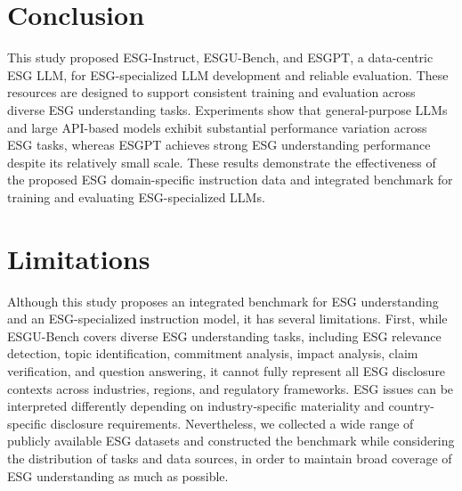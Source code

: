 \documentclass[11pt]{article}
\begin{document}
\section{Conclusion}
\label{sec:conclusion}
This study proposed \textsf{ESG-Instruct}, \textsf{ESGU-Bench}, and \textsf{ESGPT}, a data-centric ESG LLM, for ESG-specialized LLM development and reliable evaluation. These resources are designed to support consistent training and evaluation across diverse ESG understanding tasks. Experiments show that general-purpose LLMs and large API-based models exhibit substantial performance variation across ESG tasks, whereas \textsf{ESGPT} achieves strong ESG understanding performance despite its relatively small scale. These results demonstrate the effectiveness of the proposed ESG domain-specific instruction data and integrated benchmark for training and evaluating ESG-specialized LLMs.

\section*{Limitations}
Although this study proposes an integrated benchmark for ESG understanding and an ESG-specialized instruction model, it has several limitations. 
First, while \textsf{ESGU-Bench} covers diverse ESG understanding tasks, including ESG relevance detection, topic identification, commitment analysis, impact analysis, claim verification, and question answering, it cannot fully represent all ESG disclosure contexts across industries, regions, and regulatory frameworks. 
ESG issues can be interpreted differently depending on industry-specific materiality and country-specific disclosure requirements. 
Nevertheless, we collected a wide range of publicly available ESG datasets and constructed the benchmark while considering the distribution of tasks and data sources, in order to maintain broad coverage of ESG understanding as much as possible.
\end{document}
